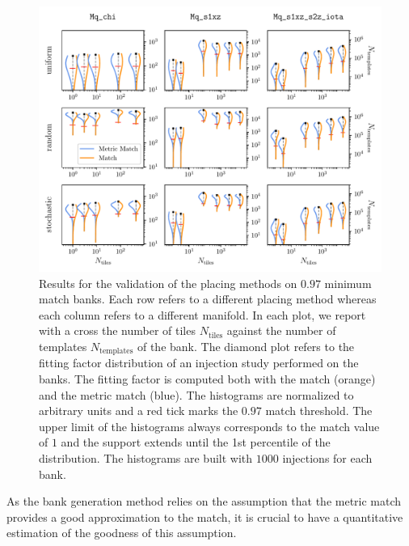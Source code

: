 \documentclass[twocolumn,showpacs,preprintnumbers,nofootinbib,prd,
superscriptaddress,10pt]{revtex4-2}
\begin{document}
\begin{figure}[th!]
	\centering
	\includegraphics[width=.85\textwidth,keepaspectratio]{placing_validation}
	\caption{Results for the validation of the placing methods on $0.97$ minimum match banks. Each row refers to a different placing method whereas each column refers to a different manifold. In each plot, we report with a cross the number of tiles $N_{\text{tiles}}$ against the number of templates $N_{\text{templates}}$ of the bank.
	The diamond plot refers to the fitting factor distribution of an injection study performed on the banks. The fitting factor is computed both with the match (orange) and the metric match (blue). The histograms are normalized to arbitrary units and a red tick marks the $0.97$ match threshold. The upper limit of the histograms always corresponds to the match value of $1$ and the support extends until the 1st percentile of the distribution.
	The histograms are built with $1000$ injections for each bank.
	}
	\label{fig:placing_validation}
\end{figure}

As the bank generation method relies on the assumption that the metric match provides a good approximation to the match, it is crucial to have a quantitative estimation of the goodness of this assumption.
\end{document}
